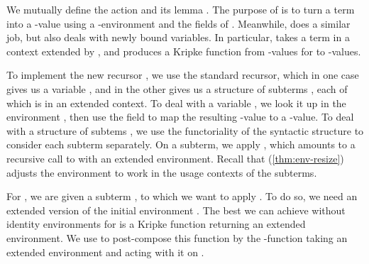 
We mutually define the action  and its lemma
.
The purpose of  is to turn a term into a
\AgdaBound{$\C$}-value using a \AgdaBound{$\V$}-environment and the fields of
.
Meanwhile,  does a similar job, but also deals with
newly bound variables.
In particular,  takes a term in a context extended by
\AgdaBound{$\Theta$}, and produces a Kripke function from
\AgdaBound{$\V$}-values for \AgdaBound{$\Theta$} to \AgdaBound{$\C$}-values.


To implement the new recursor , we use the standard
recursor, which in one case gives us a variable , and in the other
gives us a structure of subterms , each of which is in an extended
context.
To deal with a variable , we look it
up in the environment \AgdaBound{$\rho$}, then use the
 field to map the resulting
\AgdaBound{$\V$}-value to a \AgdaBound{$\C$}-value.
To deal with a structure of subtems , we use the functoriality of
the syntactic structure to consider each subterm separately.
On a subterm, we apply , which amounts to a recursive call
to  with an extended environment.
Recall that  (\cref{thm:env-resize}) adjusts the
environment \AgdaBound{$\rho$} to work in the usage contexts of the subterms.


For , we are given a subterm , to which we
want to apply .
To do so, we need an extended version of the initial environment
\AgdaBound{$\rho$}.
The best we can achieve without identity environments for \AgdaBound{$\V$} is
a Kripke function returning an extended environment.
We use  to post-compose this function by the
\AgdaSymbol{$\lambda$}-function taking an extended environment and acting with
it on .

